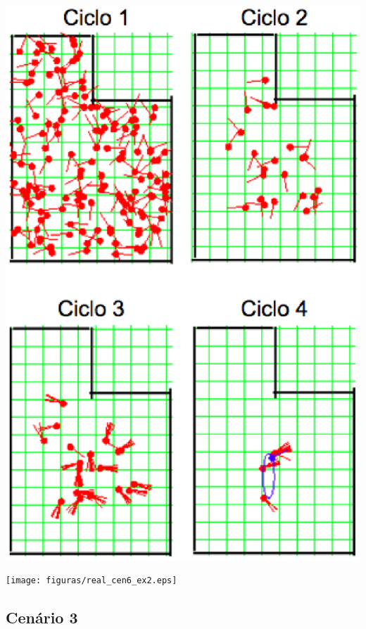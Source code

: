 {\centering
\includegraphics[scale=0.4]{figuras/cen6_ex2.eps}
\label{img:cen6_ex2}
\par}

{\centering
\texttt{[image: figuras/real\_cen6\_ex2.eps]}
\label{img:real_cen6_ex2}
\par}

\subsection{Cenário 3}

